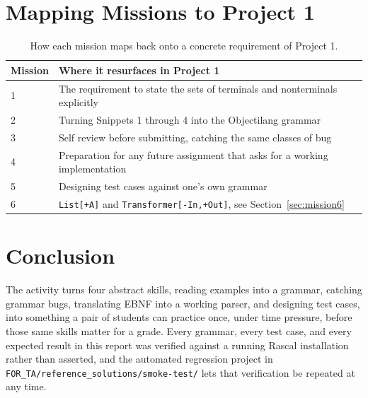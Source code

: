 \documentclass[11pt]{article}
\begin{document}
\section{Mapping Missions to Project 1}

\hspace{1cm}

\begin{table}[h!]
\centering
\small
\begin{tabularx}{\textwidth}{@{}l X@{}}
\toprule
\textbf{Mission} & \textbf{Where it resurfaces in Project 1} \\
\midrule
1 & The requirement to state the sets of terminals and nonterminals explicitly \\
2 & Turning Snippets 1 through 4 into the Objectilang grammar \\
3 & Self review before submitting, catching the same classes of bug \\
4 & Preparation for any future assignment that asks for a working implementation \\
5 & Designing test cases against one's own grammar \\
6 & \texttt{List[+A]} and \texttt{Transformer[-In,+Out]}, see Section~\ref{sec:mission6} \\
\bottomrule
\end{tabularx}
\caption{How each mission maps back onto a concrete requirement of Project 1.}
\end{table}


\section{Conclusion}

The activity turns four abstract skills, reading examples into a grammar,
catching grammar bugs, translating EBNF into a working parser, and
designing test cases, into something a pair of students can practice once,
under time pressure, before those same skills matter for a grade. Every
grammar, every test case, and every expected result in this report was
verified against a running Rascal installation rather than asserted, and
the automated regression project in
\texttt{FOR\_TA/reference\_solutions/smoke-test/} lets that verification be
repeated at any time.
\end{document}
